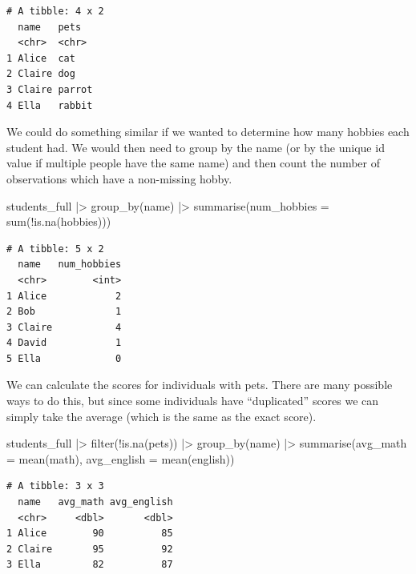 \documentclass[
  letterpaper,
  DIV=11,
  numbers=noendperiod]{scrreprt}
\newenvironment{Shaded}{\begin{snugshade}}{\end{snugshade}}
\newcommand{\AttributeTok}[1]{\textcolor[rgb]{0.40,0.45,0.13}{#1}}
\newcommand{\FunctionTok}[1]{\textcolor[rgb]{0.28,0.35,0.67}{#1}}
\newcommand{\NormalTok}[1]{\textcolor[rgb]{0.00,0.23,0.31}{#1}}
\newcommand{\SpecialCharTok}[1]{\textcolor[rgb]{0.37,0.37,0.37}{#1}}
\begin{document}
\begin{verbatim}
# A tibble: 4 x 2
  name   pets  
  <chr>  <chr> 
1 Alice  cat   
2 Claire dog   
3 Claire parrot
4 Ella   rabbit
\end{verbatim}

We could do something similar if we wanted to determine how many hobbies
each student had. We would then need to group by the name (or by the
unique id value if multiple people have the same name) and then count
the number of observations which have a non-missing hobby.

\begin{Shaded}
\begin{Highlighting}[]
\NormalTok{students\_full }\SpecialCharTok{|\textgreater{}}
  \FunctionTok{group\_by}\NormalTok{(name) }\SpecialCharTok{|\textgreater{}}
  \FunctionTok{summarise}\NormalTok{(}\AttributeTok{num\_hobbies =} \FunctionTok{sum}\NormalTok{(}\SpecialCharTok{!}\FunctionTok{is.na}\NormalTok{(hobbies)))}
\end{Highlighting}
\end{Shaded}

\begin{verbatim}
# A tibble: 5 x 2
  name   num_hobbies
  <chr>        <int>
1 Alice            2
2 Bob              1
3 Claire           4
4 David            1
5 Ella             0
\end{verbatim}

We can calculate the scores for individuals with pets. There are many
possible ways to do this, but since some individuals have ``duplicated''
scores we can simply take the average (which is the same as the exact
score).

\begin{Shaded}
\begin{Highlighting}[]
\NormalTok{students\_full }\SpecialCharTok{|\textgreater{}}
  \FunctionTok{filter}\NormalTok{(}\SpecialCharTok{!}\FunctionTok{is.na}\NormalTok{(pets)) }\SpecialCharTok{|\textgreater{}}
  \FunctionTok{group\_by}\NormalTok{(name) }\SpecialCharTok{|\textgreater{}}
  \FunctionTok{summarise}\NormalTok{(}\AttributeTok{avg\_math =} \FunctionTok{mean}\NormalTok{(math), }\AttributeTok{avg\_english =} \FunctionTok{mean}\NormalTok{(english))}
\end{Highlighting}
\end{Shaded}

\begin{verbatim}
# A tibble: 3 x 3
  name   avg_math avg_english
  <chr>     <dbl>       <dbl>
1 Alice        90          85
2 Claire       95          92
3 Ella         82          87
\end{verbatim}
\end{document}

